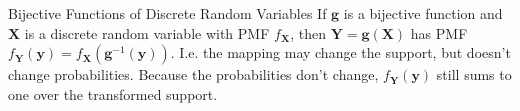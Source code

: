 \documentclass[10pt]{beamer}
\begin{document}
\begin{frame}[fragile]{Bijective Functions of Discrete Random Variables}
If \(\bm{g}\) is a bijective function and \(\bm{X}\) is a discrete random variable with PMF \(f_{\bm{X}}\), then \(\bm{Y} = \bm{g}\left(\bm{X}\right)\) has PMF \(f_{\bm{Y}}\left(\bm{y}\right) = f_{\bm{X}}\left(\bm{g}^{-1}\left(\bm{y}\right)\right)\). I.e. the mapping may change the support, but doesn't change probabilities. Because the probabilities don't change, \(f_{\bm{Y}}\left(\bm{y}\right)\) still sums to one over the transformed support.
\end{frame}
\end{document}
